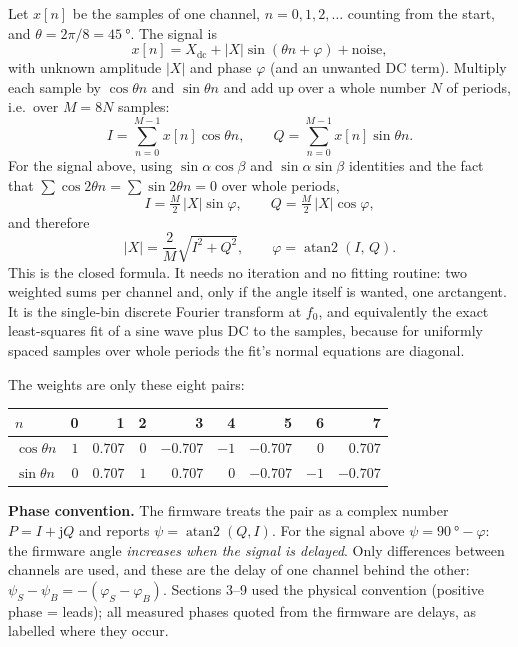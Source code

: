 \documentclass[11pt,a4paper]{article}
\begin{document}
Let $x[n]$ be the samples of one channel, $n=0,1,2,\dots$ counting from the
start, and $\theta=2\pi/8=\SI{45}{\degree}$.  The signal is
\begin{equation}
  x[n] = X_{\mathrm{dc}} + |X|\sin(\theta n + \varphi) + \text{noise},
\end{equation}
with unknown amplitude $|X|$ and phase $\varphi$ (and an unwanted DC term).
Multiply each sample by $\cos\theta n$ and $\sin\theta n$ and add up over a
whole number $N$ of periods, i.e.\ over $M=8N$ samples:
\begin{equation}
  I = \sum_{n=0}^{M-1} x[n]\cos\theta n, \qquad
  Q = \sum_{n=0}^{M-1} x[n]\sin\theta n .
  \label{eq:IQ}
\end{equation}
For the signal above, using $\sin\alpha\cos\beta$ and $\sin\alpha\sin\beta$
identities and the fact that $\sum\cos 2\theta n=\sum\sin 2\theta n=0$ over
whole periods,
\begin{equation}
  I = \tfrac{M}{2}\,|X|\sin\varphi,\qquad
  Q = \tfrac{M}{2}\,|X|\cos\varphi,
\end{equation}
and therefore
\begin{equation}
  \boxed{\;|X| = \frac{2}{M}\sqrt{I^2+Q^2}, \qquad
  \varphi = \operatorname{atan2}(I,\,Q).\;}
  \label{eq:closedform}
\end{equation}
This is the closed formula.  It needs no iteration and no fitting
routine: two weighted sums per channel and, only if the angle itself is
wanted, one arctangent.  It is the single-bin discrete Fourier transform at
$f_0$, and equivalently the exact least-squares fit of a sine wave plus DC
to the samples, because for uniformly spaced samples over whole periods the
fit's normal equations are diagonal.

The weights are only these eight pairs:
\begin{center}
\small
\begin{tabular}{@{}l*{8}{r}@{}}
\toprule
$n$ & 0 & 1 & 2 & 3 & 4 & 5 & 6 & 7 \\
\midrule
$\cos\theta n$ & $1$ & $0.707$ & $0$ & $-0.707$ & $-1$ & $-0.707$ & $0$ & $0.707$ \\
$\sin\theta n$ & $0$ & $0.707$ & $1$ & $0.707$ & $0$ & $-0.707$ & $-1$ & $-0.707$ \\
\bottomrule
\end{tabular}
\end{center}

\textbf{Phase convention.}  The firmware treats the pair as a complex number
$P=I+\mathrm{j}Q$ and reports $\psi=\operatorname{atan2}(Q,I)$.  For the
signal above $\psi = \SI{90}{\degree}-\varphi$: the firmware angle
\emph{increases when the signal is delayed}.  Only differences between
channels are used, and these are the delay of one channel behind the
other: $\psi_S-\psi_B = -(\varphi_S-\varphi_B)$.  Sections 3--9 used the
physical convention (positive phase = leads); all measured phases quoted from
the firmware are delays, as labelled where they occur.
\end{document}
